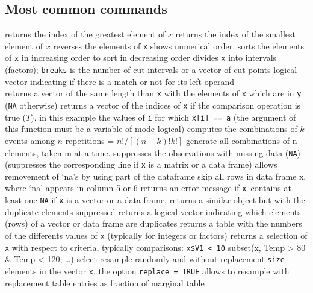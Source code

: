 \subsection{Most common commands}{}
	{ returns the index of the greatest element of $x$}
	{ returns the index of the smallest element of $x$}
	{ reverses the elements of {\tt x}}
	{shows numerical order, sorts the elements of {\tt x} in increasing order}
	{to sort in decreasing order}
	{divides {\tt x} into intervals (factors); {\tt breaks} is the number of cut intervals or a vector of cut points}
	{logical vector indicating if there is a match or not for its left operand\\}
	{returns a vector of the same length than {\tt x}
    with the elements of {\tt x} which are in {\tt y} ({\tt NA}
    otherwise)}
	{returns a vector of the indices of {\tt x} if the
comparison operation is true ($T$), in this example the values of {\tt i} for
which {\tt x[i] == a} (the argument of this function must be a variable of mode logical)}
	{ computes the combinations of $k$ events among $n$ repetitions = $n!/[(n-k)!k!]$}
	{ generate all combinations of n elements, taken m at a time.}
	{suppresses the observations with missing data ({\tt NA}) (suppresses the corresponding line if {\tt x} is a matrix or a data frame)}
	{allows removement of `na's by using part of the dataframe} %
	{skip all rows in data frame x, where `na' appears in column 5 or 6}
	{returns an error message if {\tt x }contains at least one {\tt NA}}
	{if {\tt x} is a vector or a data frame, returns a similar object but with the duplicate elements suppressed}
	{returns a logical vector indicating which elements (rows) of a vector or data frame are duplicates}
	{returns a table with the numbers of the differents values of {\tt x} (typically for integers or factors)}
	{returns a selection of {\tt x} with respect to criteria, typically comparisons: {\tt x\$V1 < 10}}
	{subset(x, Temp > 80 \& Temp < 120, \ldots)}
	{select}
	{resample randomly and without replacement {\tt size}
elements in the vector {\tt x}, the option {\tt replace = TRUE} allows to
resample with replacement}
	{table entries as fraction of marginal table}

